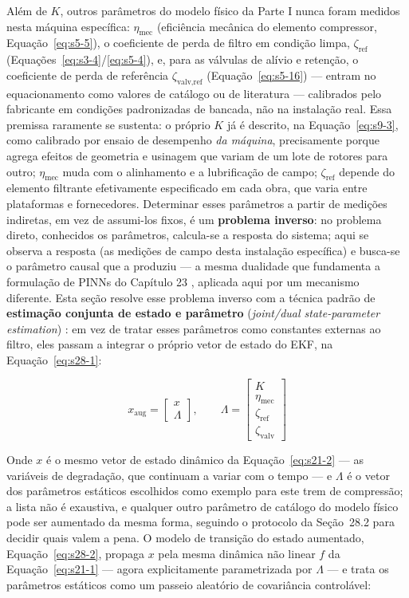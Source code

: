 \documentclass[12pt,a4paper]{article}
\numberwithin{equation}{section}
\numberwithin{table}{section}
\numberwithin{figure}{section}
\begin{document}
{Além de $K$, outros parâmetros do modelo físico da Parte I nunca foram medidos nesta máquina específica: $\eta_{\text{mec}}$ (eficiência mecânica do elemento compressor, Equação~\eqref{eq:s5-5}), o coeficiente de perda de filtro em condição limpa, $\zeta_{\text{ref}}$ (Equações~\eqref{eq:s3-4}/\eqref{eq:s5-4}), e, para as válvulas de alívio e retenção, o coeficiente de perda de referência $\zeta_{\text{valv,ref}}$ (Equação~\eqref{eq:s5-16}) — entram no equacionamento como valores de catálogo ou de literatura — calibrados pelo fabricante em condições padronizadas de bancada, não na instalação real. Essa premissa raramente se sustenta: o próprio $K$ já é descrito, na Equação~\eqref{eq:s9-3}, como calibrado por ensaio de desempenho \textit{da máquina}, precisamente porque agrega efeitos de geometria e usinagem que variam de um lote de rotores para outro; $\eta_{\text{mec}}$ muda com o alinhamento e a lubrificação de campo; $\zeta_{\text{ref}}$ depende do elemento filtrante efetivamente especificado em cada obra, que varia entre plataformas e fornecedores. Determinar esses parâmetros a partir de medições indiretas, em vez de assumi-los fixos, é um \textbf{problema inverso}: no problema direto, conhecidos os parâmetros, calcula-se a resposta do sistema; aqui se observa a resposta (as medições de campo desta instalação específica) e busca-se o parâmetro causal que a produziu — a mesma dualidade que fundamenta a formulação de PINNs do Capítulo 23 \cite{piml}, aplicada aqui por um mecanismo diferente. Esta seção resolve esse problema inverso com a técnica padrão de \textbf{estimação conjunta de estado e parâmetro} (\textit{joint/dual state-parameter estimation}) \cite{simon}: em vez de tratar esses parâmetros como constantes externas ao filtro, eles passam a integrar o próprio vetor de estado do EKF, na Equação~\eqref{eq:s28-1}:

\begin{equation}\label{eq:s28-1}
x_{\text{aug}} = \begin{bmatrix} x \\ \Lambda \end{bmatrix}, \qquad \Lambda = \begin{bmatrix} K \\ \eta_{\text{mec}} \\ \zeta_{\text{ref}} \\ \zeta_{\text{valv}} \end{bmatrix}
\end{equation}

Onde $x$ é o mesmo vetor de estado dinâmico da Equação~\eqref{eq:s21-2} — as variáveis de degradação, que continuam a variar com o tempo — e $\Lambda$ é o vetor dos parâmetros estáticos escolhidos como exemplo para este trem de compressão; a lista não é exaustiva, e qualquer outro parâmetro de catálogo do modelo físico pode ser aumentado da mesma forma, seguindo o protocolo da Seção~28.2 para decidir quais valem a pena. O modelo de transição do estado aumentado, Equação~\eqref{eq:s28-2}, propaga $x$ pela mesma dinâmica não linear $f$ da Equação~\eqref{eq:s21-1} — agora explicitamente parametrizada por $\Lambda$ — e trata os parâmetros estáticos como um passeio aleatório de covariância controlável:

}
\end{document}
